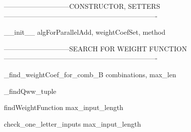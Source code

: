 -----------------------------CONSTRUCTOR, SETTERS-------------------------------------------------------------------

\begin{method}{\_\_init\_\_}{ algForParallelAdd, weightCoefSet, method}

\end{method}

-----------------------------SEARCH FOR WEIGHT FUNCTION-------------------------------------------------------------------

\begin{method}{\_find\_weightCoef\_for\_comb\_B}{ combinations, max\_len}

\end{method}


\begin{method}{\_findQw}{w\_tuple}

\end{method}


\begin{method}{findWeightFunction}{ max\_input\_length}

\end{method}


\begin{method}{check\_one\_letter\_inputs}{ max\_input\_length}

\end{method}
